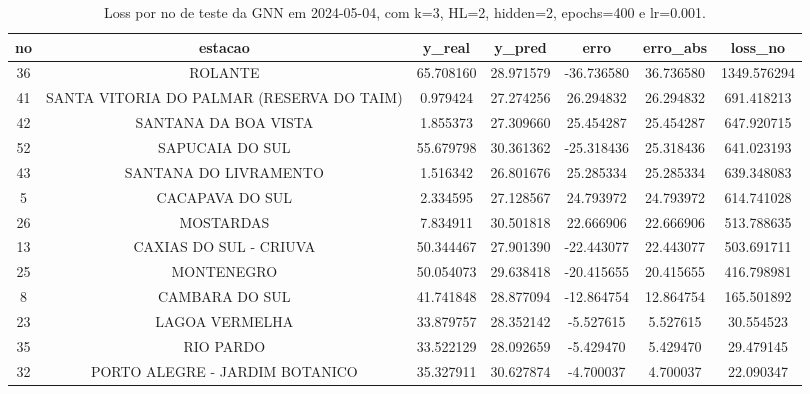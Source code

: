 \begin{table}[h]
\centering
\caption{Loss por no de teste da GNN em 2024-05-04, com k=3, HL=2, hidden=2, epochs=400 e lr=0.001.}
\label{tab:gnn_loss_k3_hl2_h2_e400_d20240504}
\begin{tabular}{ccccccc}
\toprule
no & estacao & y\_real & y\_pred & erro & erro\_abs & loss\_no \\
\midrule
36 & ROLANTE & 65.708160 & 28.971579 & -36.736580 & 36.736580 & 1349.576294 \\
41 & SANTA VITORIA DO PALMAR (RESERVA DO TAIM) & 0.979424 & 27.274256 & 26.294832 & 26.294832 & 691.418213 \\
42 & SANTANA DA BOA VISTA & 1.855373 & 27.309660 & 25.454287 & 25.454287 & 647.920715 \\
52 & SAPUCAIA DO SUL & 55.679798 & 30.361362 & -25.318436 & 25.318436 & 641.023193 \\
43 & SANTANA DO LIVRAMENTO & 1.516342 & 26.801676 & 25.285334 & 25.285334 & 639.348083 \\
5 & CACAPAVA DO SUL & 2.334595 & 27.128567 & 24.793972 & 24.793972 & 614.741028 \\
26 & MOSTARDAS & 7.834911 & 30.501818 & 22.666906 & 22.666906 & 513.788635 \\
13 & CAXIAS DO SUL - CRIUVA & 50.344467 & 27.901390 & -22.443077 & 22.443077 & 503.691711 \\
25 & MONTENEGRO & 50.054073 & 29.638418 & -20.415655 & 20.415655 & 416.798981 \\
8 & CAMBARA DO SUL & 41.741848 & 28.877094 & -12.864754 & 12.864754 & 165.501892 \\
23 & LAGOA VERMELHA & 33.879757 & 28.352142 & -5.527615 & 5.527615 & 30.554523 \\
35 & RIO PARDO & 33.522129 & 28.092659 & -5.429470 & 5.429470 & 29.479145 \\
32 & PORTO ALEGRE - JARDIM BOTANICO & 35.327911 & 30.627874 & -4.700037 & 4.700037 & 22.090347 \\
\bottomrule
\end{tabular}
\end{table}
